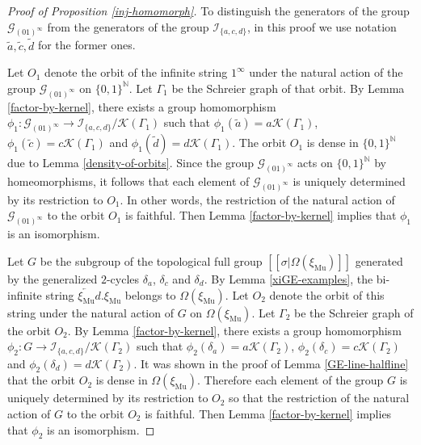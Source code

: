 \documentclass[12pt]{article}
\theoremstyle{definition}
\def\bN{\mathbb{N}}
\def\cG{\mathcal{G}}
\def\cI{\mathcal{I}}
\def\cK{\mathcal{K}}
\def\de{\delta}
\def\si{\sigma}
\def\Om{\Omega}
\def\xiGE{\xi_{\mathrm{Mu}}}
\begin{document}
\begin{proof}[Proof of Proposition \ref{inj-homomorph}]
To distinguish the generators of the group $\cG_{(01)^\infty}$ from the 
generators of the group $\cI_{\{a,c,d\}}$, in this proof we use notation 
$\tilde a,\tilde c,\tilde d$ for the former ones.

Let $O_1$ denote the orbit of the infinite string $1^\infty$ under the 
natural action of the group $\cG_{(01)^\infty}$ on $\{0,1\}^{\bN}$.  Let 
$\Gamma_1$ be the Schreier graph of that orbit.  By Lemma 
\ref{factor-by-kernel}, there exists a group homomorphism 
$\phi_1:\cG_{(01)^\infty}\to\cI_{\{a,c,d\}}/\cK(\Gamma_1)$ such that 
$\phi_1(\tilde a)=a\cK(\Gamma_1)$, $\phi_1(\tilde c)=c\cK(\Gamma_1)$ and 
$\phi_1(\tilde d)=d\cK(\Gamma_1)$.  The orbit $O_1$ is dense in 
$\{0,1\}^{\bN}$ due to Lemma \ref{density-of-orbits}.  Since the group 
$\cG_{(01)^\infty}$ acts on $\{0,1\}^{\bN}$ by homeomorphisms, it follows 
that each element of $\cG_{(01)^\infty}$ is uniquely determined by its 
restriction to $O_1$.  In other words, the restriction of the natural 
action of $\cG_{(01)^\infty}$ to the orbit $O_1$ is faithful.  Then Lemma 
\ref{factor-by-kernel} implies that $\phi_1$ is an isomorphism.

Let $G$ be the subgroup of the topological full group 
$[[\si|\Omega(\xiGE)]]$ generated by the generalized $2$-cycles $\de_a$, 
$\de_c$ and $\de_d$.  By Lemma \ref{xiGE-examples}, the bi-infinite string 
$\overleftarrow{\xiGE}d.\xiGE$ belongs to $\Om(\xiGE)$.  Let $O_2$ denote 
the orbit of this string under the natural action of $G$ on $\Om(\xiGE)$.  
Let $\Gamma_2$ be the Schreier graph of the orbit $O_2$.  By Lemma 
\ref{factor-by-kernel}, there exists a group homomorphism 
$\phi_2:G\to\cI_{\{a,c,d\}}/\cK(\Gamma_2)$ such that 
$\phi_2(\de_a)=a\cK(\Gamma_2)$, $\phi_2(\de_c)=c\cK(\Gamma_2)$ and 
$\phi_2(\de_d)=d\cK(\Gamma_2)$.  It was shown in the proof of Lemma 
\ref{GE-line-halfline} that the orbit $O_2$ is dense in $\Om(\xiGE)$.  
Therefore each element of the group $G$ is uniquely determined by its 
restriction to $O_2$ so that the restriction of the natural action of $G$ 
to the orbit $O_2$ is faithful.  Then Lemma \ref{factor-by-kernel} implies 
that $\phi_2$ is an isomorphism.


\end{proof}
\end{document}
